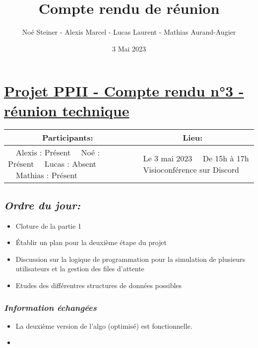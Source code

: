 \documentclass[french,a4paper]{article}
\author{Noé Steiner - Alexis Marcel - Lucas Laurent - Mathias Aurand-Augier}
\date{3 Mai 2023}
\newcommand{\tabitem}{\textbullet~~}\title{Compte rendu de réunion}
\begin{document}
\maketitle

\section*{\underline{Projet PPII - Compte rendu n°3 - réunion technique}}

\begin{table}[!htb]
  \centering
  \begin{tabular}{| p{7cm} | p{7cm} |}
    \hline
    \multicolumn{1}{|c|}{ Participants:} & \multicolumn{1}{c|}{Lieu:} \\
    \hline
    \tabitem Alexis : Présent\newline
    \tabitem Noé : Présent\newline
    \tabitem Lucas : Absent\newline
    \tabitem Mathias : Présent                      &
    \tabitem Le 3 mai 2023\newline
    \tabitem De 15h à 17h\newline
    \tabitem Visioconférence sur Discord                                         \\
    \hline
  \end{tabular}
\end{table}

\subsection*{\textit{Ordre du jour:}}

\begin{itemize}
  \item Cloture de la partie 1
  \item Établir un plan pour la deuxième étape du projet
  \item Discussion sur la logique de programmation pour la simulation de plusieurs utilisateurs et la gestion des files d'attente
  \item Etudes des différentres structures de données possibles
\end{itemize}

\subsubsection*{\textit{Information échangées}}
\begin{itemize}
  \item La deuxième version de l'algo (optimisé) est fonctionnelle.
  \item 
\end{itemize}
\end{document}
